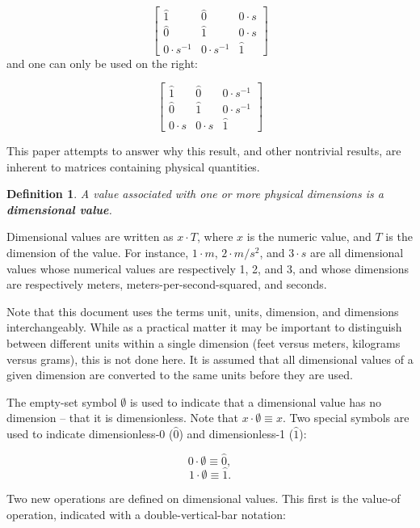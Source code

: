 \documentclass[10pt,letterpaper]{article}
\newtheorem{defn}{Definition}[section]
\numberwithin{equation}{section}
\begin{document}
 \[ \left[ \begin{matrix} 
  \hat 1 & \hat 0 & 0 \cdot s \\
  \hat 0 & \hat 1 & 0 \cdot s \\
  0 \cdot s^{-1} & 0 \cdot s^{-1} & \hat 1
 \end{matrix} \right] \] and one can only be used on the right:

\[ \left[ \begin{matrix} 
  \hat 1 & \hat 0 & 0 \cdot s^{-1} \\
  \hat 0 & \hat 1 & 0 \cdot s^{-1} \\
  0 \cdot s & 0 \cdot s & \hat 1
 \end{matrix} \right] \]
 
This paper attempts to answer why this result, and other nontrivial
results, are inherent to matrices containing physical quantities.

\begin{defn} A value associated with one or more physical dimensions
  is a \textbf{dimensional value}. \end{defn}
 
Dimensional values are written as $x \cdot T$, where $x$ is the
numeric value, and $T$ is the dimension of the value.  For instance,
$1 \cdot m$, $2 \cdot m/s^2$, and $3 \cdot s$ are all dimensional
values whose numerical values are respectively 1, 2, and 3, and whose
dimensions are respectively meters, meters-per-second-squared, and
seconds.
 
Note that this document uses the terms unit, units, dimension, and dimensions
interchangeably.  While as a practical matter it may be important to
distinguish between different units within a single dimension (feet versus
meters, kilograms versus grams), this is not done here.  It is assumed that
all dimensional values of a given dimension are converted to the same units
before they are used.
 
The empty-set symbol $\emptyset$ is used to indicate that a
dimensional value has no dimension – that it is dimensionless.  Note
that $x \cdot \emptyset \equiv x$.  Two special symbols are used to
indicate dimensionless-0 ($\hat 0$) and dimensionless-1 ($\hat 1$):
 
 \[ 0 \cdot \emptyset \equiv \hat 0, \]
 \[ 1 \cdot \emptyset \equiv \hat 1. \]

Two new operations are defined on dimensional values.  This first is
the value-of operation, indicated with a double-vertical-bar
notation:
\end{document}
